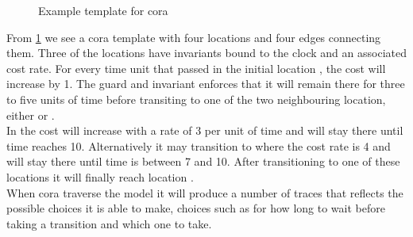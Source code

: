 \begin{figure}[H]
	\centering
	\caption{Example template for \gls{cora}}
	\label{fig:cora_eks}
\end{figure}
From \cref{fig:cora_eks} we see a \gls{cora} template with four locations and four edges connecting them. 
Three of the locations have invariants bound to the clock  and an associated cost rate. 
For every time unit that passed in the initial location , the cost will increase by 1. 
The guard and invariant enforces that it will remain there for three to five units of time before transiting to one of the two neighbouring location, either  or .\\ 
In  the cost will increase with a rate of 3 per unit of time and will stay there until time reaches 10. 
Alternatively it may transition to  where the cost rate is 4 and will stay there until time is between 7 and 10. 
After transitioning to one of these locations it will finally reach location . \\
When \gls{cora} traverse the model it will produce a number of traces that reflects the possible choices it is able to make, choices such as for how long to wait before taking a transition and which one to take.
